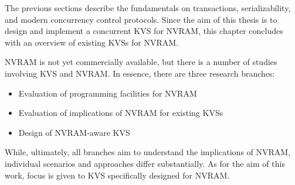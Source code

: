 
The previous sections describe the fundamentals on transactions,
serializability, and modern concurrency control protocols.  Since the aim of
this thesis is to design and implement a concurrent \ac{KVS} for \ac{NVRAM},
this chapter concludes with an overview of existing \acp{KVS} for \ac{NVRAM}.

\ac{NVRAM} is not yet commercially available, but there is a number of studies
involving \ac{KVS} and \ac{NVRAM}. In essence, there are three research
branches:

\begin{itemize}
    \item Evaluation of programming facilities for \ac{NVRAM}
    \item Evaluation of implications of \ac{NVRAM} for existing \acp{KVS}
    \item Design of \ac{NVRAM}-aware \ac{KVS}
\end{itemize}

While, ultimately, all branches aim to understand the implications of
\ac{NVRAM}, individual scenarios and approaches differ substantially. As for the
aim of this work, focus is given to \ac{KVS} specifically designed for
\ac{NVRAM}.



